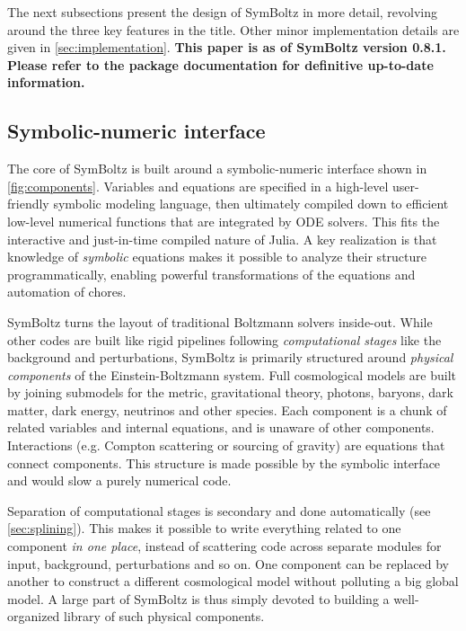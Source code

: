 \documentclass{aa}
\begin{document}
The next subsections present the design of SymBoltz in more detail, revolving around the three key features in the title.
Other minor implementation details are given in \cref{sec:implementation}.
\textbf{This paper is as of SymBoltz version 0.8.1. Please refer to the package documentation for definitive up-to-date information.}

\subsection{Symbolic-numeric interface}
\label{sec:symbolicnumeric}

The core of SymBoltz is built around a symbolic-numeric interface shown in \cref{fig:components}.
Variables and equations are specified in a high-level user-friendly symbolic modeling language, then ultimately compiled down to efficient low-level numerical functions that are integrated by ODE solvers.
This fits the interactive and just-in-time compiled nature of Julia.
A key realization is that knowledge of \emph{symbolic} equations makes it possible to analyze their structure programmatically, enabling powerful transformations of the equations and automation of chores.

SymBoltz turns the layout of traditional Boltzmann solvers inside-out.
While other codes are built like rigid pipelines following \emph{computational stages} like the background and perturbations,
SymBoltz is primarily structured around \emph{physical components} of the Einstein-Boltzmann system.
Full cosmological models are built by joining submodels for the metric, gravitational theory, photons, baryons, dark matter, dark energy, neutrinos and other species.
Each component is a chunk of related variables and internal equations, and is unaware of other components.
Interactions (e.g. Compton scattering or sourcing of gravity) are equations that connect components.
This structure is made possible by the symbolic interface and would slow a purely numerical code.

Separation of computational stages is secondary and done automatically (see \cref{sec:splining}).
This makes it possible to write everything related to one component \emph{in one place}, instead of scattering code across separate modules for input, background, perturbations and so on.
One component can be replaced by another to construct a different cosmological model without polluting a big global model.
A large part of SymBoltz is thus simply devoted to building a well-organized library of such physical components.
\end{document}
